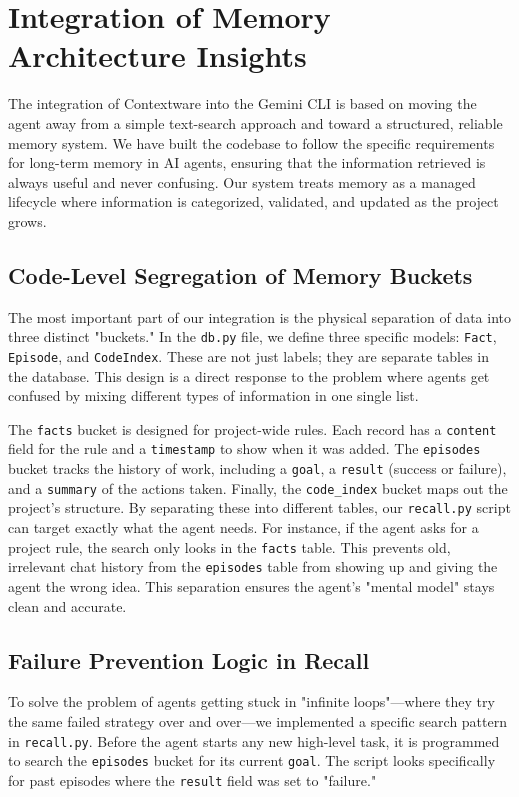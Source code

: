 \documentclass[conference]{IEEEtran}
\begin{document}
\section{Integration of Memory Architecture Insights}

The integration of Contextware into the Gemini CLI is based on moving the agent away from a simple text-search approach and toward a structured, reliable memory system. We have built the codebase to follow the specific requirements for long-term memory in AI agents, ensuring that the information retrieved is always useful and never confusing. Our system treats memory as a managed lifecycle where information is categorized, validated, and updated as the project grows.

\subsection{Code-Level Segregation of Memory Buckets}
The most important part of our integration is the physical separation of data into three distinct "buckets." In the \texttt{db.py} file, we define three specific models: \texttt{Fact}, \texttt{Episode}, and \texttt{CodeIndex}. These are not just labels; they are separate tables in the database. This design is a direct response to the problem where agents get confused by mixing different types of information in one single list.

The \texttt{facts} bucket is designed for project-wide rules. Each record has a \texttt{content} field for the rule and a \texttt{timestamp} to show when it was added. The \texttt{episodes} bucket tracks the history of work, including a \texttt{goal}, a \texttt{result} (success or failure), and a \texttt{summary} of the actions taken. Finally, the \texttt{code\_index} bucket maps out the project's structure. By separating these into different tables, our \texttt{recall.py} script can target exactly what the agent needs. For instance, if the agent asks for a project rule, the search only looks in the \texttt{facts} table. This prevents old, irrelevant chat history from the \texttt{episodes} table from showing up and giving the agent the wrong idea. This separation ensures the agent's "mental model" stays clean and accurate.

\subsection{Failure Prevention Logic in Recall}
To solve the problem of agents getting stuck in "infinite loops"—where they try the same failed strategy over and over—we implemented a specific search pattern in \texttt{recall.py}. Before the agent starts any new high-level task, it is programmed to search the \texttt{episodes} bucket for its current \texttt{goal}. The script looks specifically for past episodes where the \texttt{result} field was set to "failure."
\end{document}
